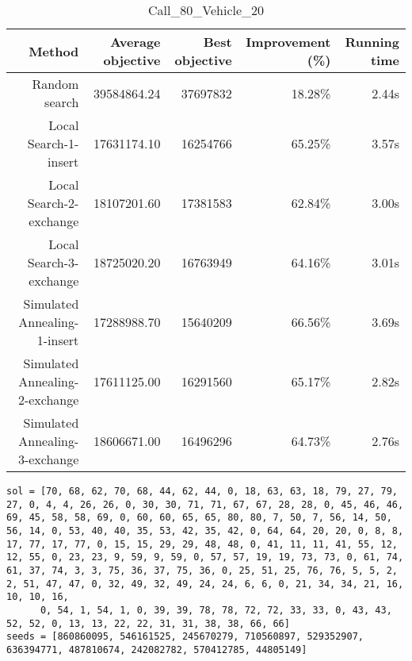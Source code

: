 \begin{table}[ht]
\centering
\caption{Call\_80\_Vehicle\_20}
\label{tab:call80vehicle20}
\begin{tabular}{|r|r|r|r|r|}
Method & Average objective & Best objective & Improvement (\%) & Running time \\
\hline
Random search & 39584864.24 & 37697832 & 18.28\% & 2.44s\\
Local Search-1-insert & 17631174.10 & 16254766 & 65.25\% & 3.57s\\
Local Search-2-exchange & 18107201.60 & 17381583 & 62.84\% & 3.00s\\
Local Search-3-exchange & 18725020.20 & 16763949 & 64.16\% & 3.01s\\
Simulated Annealing-1-insert & 17288988.70 & 15640209 & 66.56\% & 3.69s\\
Simulated Annealing-2-exchange & 17611125.00 & 16291560 & 65.17\% & 2.82s\\
Simulated Annealing-3-exchange & 18606671.00 & 16496296 & 64.73\% & 2.76s\\
\end{tabular}%
\end{table}
\begin{lstlisting}[label={lst:call80vehicle20},caption=Optimal solution call\_80\_vehicle\_20]
sol = [70, 68, 62, 70, 68, 44, 62, 44, 0, 18, 63, 63, 18, 79, 27, 79, 27, 0, 4, 4, 26, 26, 0, 30, 30, 71, 71, 67, 67, 28, 28, 0, 45, 46, 46, 69, 45, 58, 58, 69, 0, 60, 60, 65, 65, 80, 80, 7, 50, 7, 56, 14, 50, 56, 14, 0, 53, 40, 40, 35, 53, 42, 35, 42, 0, 64, 64, 20, 20, 0, 8, 8, 17, 77, 17, 77, 0, 15, 15, 29, 29, 48, 48, 0, 41, 11, 11, 41, 55, 12, 12, 55, 0, 23, 23, 9, 59, 9, 59, 0, 57, 57, 19, 19, 73, 73, 0, 61, 74, 61, 37, 74, 3, 3, 75, 36, 37, 75, 36, 0, 25, 51, 25, 76, 76, 5, 5, 2, 2, 51, 47, 47, 0, 32, 49, 32, 49, 24, 24, 6, 6, 0, 21, 34, 34, 21, 16, 10, 10, 16,
      0, 54, 1, 54, 1, 0, 39, 39, 78, 78, 72, 72, 33, 33, 0, 43, 43, 52, 52, 0, 13, 13, 22, 22, 31, 31, 38, 38, 66, 66]
seeds = [860860095, 546161525, 245670279, 710560897, 529352907, 636394771, 487810674, 242082782, 570412785, 44805149]
\end{lstlisting}%
\clearpage


